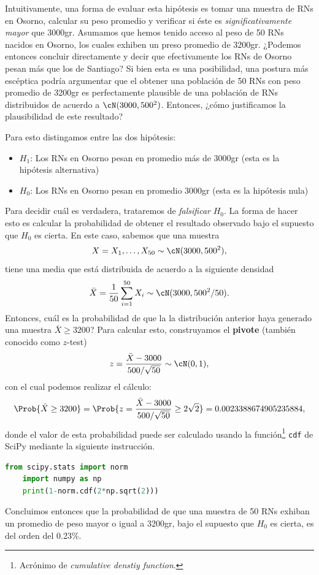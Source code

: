 Intuitivamente, una forma de evaluar esta hipótesis es tomar una muestra de RNs en Osorno, calcular su peso promedio y verificar si éste es \textit{significativamente mayor} que 3000gr. Asumamos que hemos tenido acceso al peso de 50 RNs nacidos en Osorno, los cuales exhiben un preso promedio de 3200gr. ¿Podemos entonces concluir directamente y decir que efectivamente los RNs de Osorno pesan más que los de Santiago?  Si bien esta es una posibilidad, una postura más escéptica podría argumentar que el obtener una población de 50 RNs con peso promedio de 3200gr es perfectamente plausible de una población de RNs distribuidos de acuerdo a $\cN(3000,500^2)$. Entonces, ¿cómo justificamos la plausibilidad de este resultado?

Para esto distingamos entre las dos hipótesis: 

\begin{itemize}
	\item $H_1$: Los RNs en Osorno pesan en promedio más de 3000gr (esta es la hipótesis alternativa)
	\item $H_0$: Los RNs en Osorno pesan en promedio 3000gr (esta es la hipótesis nula)
\end{itemize}

Para decidir cuál es verdadera, trataremos de \emph{falsificar} $H_0$. La forma de hacer esto es calcular la probabilidad de obtener el resultado observado bajo el supuesto que $H_0$ es cierta. En este caso, sabemos que una muestra 
\begin{equation}
	X = X_1,\ldots,X_{50}\sim\cN(3000,500^2),
\end{equation}
tiene una media que está distribuida de acuerdo a la siguiente densidad 
\begin{equation}
	\bar{X} = \frac{1}{50} \sum_{i=1}^{50} X_i \sim \cN(3000,500^2/50).
\end{equation}
Entonces, cuál es la probabilidad de que la la distribución anterior haya generado una muestra $\bar{X}\geq3200$? Para calcular esto, construyamos el \textbf{pivote} (también conocido como $z$-test)
\begin{equation}
	z = \frac{\bar{X}-3000}{500/\sqrt{50}}\sim\cN(0,1),
\end{equation}
con el cual podemos realizar el cálculo:
\begin{equation}
	\Prob{\bar{X}\geq 3200} = \Prob{z = \frac{\bar{X}-3000}{500/\sqrt{50}}\geq 2\sqrt{2}} = 0.0023388674905235884,
\end{equation}
donde el valor de esta probabilidad puede ser calculado usando la función\footnote{Acrónimo de \textit{cumulative denstiy function}.} \texttt{cdf} de SciPy mediante la siguiente instrucción. 
\begin{lstlisting}[language=Python]
	from scipy.stats import norm
	import numpy as np
	print(1-norm.cdf(2*np.sqrt(2)))
\end{lstlisting}
Concluimos entonces que la probabilidad de que una muestra de 50 RNs exhiban un promedio de peso mayor o igual a 3200gr, bajo el supuesto que $H_0$ es cierta, es del orden del 0.23\%. 

